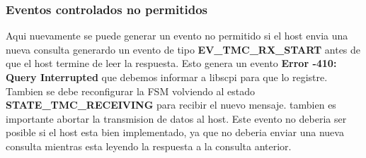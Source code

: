 \subsubsection{Eventos controlados no permitidos}
Aqui nuevamente se puede generar un evento no permitido si el host envia una nueva consulta generardo un evento de tipo \textbf{EV\_TMC\_RX\_START} antes de que el host termine de leer la respuesta. Esto genera un evento \textbf{Error -410: Query Interrupted} que debemos informar a libscpi para que lo registre. Tambien se debe reconfigurar la FSM volviendo al estado \textbf{STATE\_TMC\_RECEIVING} para recibir el nuevo mensaje. tambien es importante abortar la transmision de datos al host. Este evento no deberia ser posible si el host esta bien implementado, ya que no deberia enviar una nueva consulta mientras esta leyendo la respuesta a la consulta anterior.

